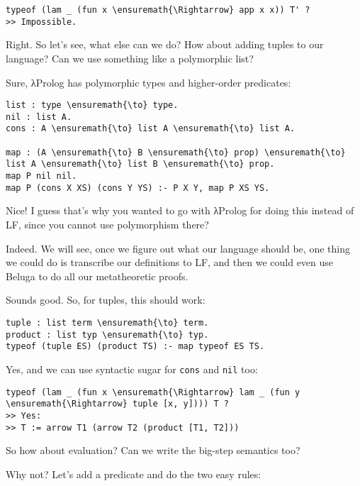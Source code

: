 \begin{verbatim}
typeof (lam _ (fun x \ensuremath{\Rightarrow} app x x)) T' ?
>> Impossible.
\end{verbatim}

\heroSTUDENT{} Right. So let's see, what else can we do? How about adding
tuples to our language? Can we use something like a polymorphic list?

\heroADVISOR{} Sure, \foreignlanguage{greek}{λ}Prolog has polymorphic types and higher-order
predicates:

\begin{verbatim}
list : type \ensuremath{\to} type.
nil : list A.
cons : A \ensuremath{\to} list A \ensuremath{\to} list A.

map : (A \ensuremath{\to} B \ensuremath{\to} prop) \ensuremath{\to} list A \ensuremath{\to} list B \ensuremath{\to} prop.
map P nil nil.
map P (cons X XS) (cons Y YS) :- P X Y, map P XS YS.
\end{verbatim}

\heroSTUDENT{} Nice! I guess that's why you wanted to go with \foreignlanguage{greek}{λ}Prolog for
doing this instead of LF, since you cannot use polymorphism there?

\heroADVISOR{} Indeed. We will see, once we figure out what our language
should be, one thing we could do is transcribe our definitions to LF,
and then we could even use Beluga \citep{pientka2010beluga} to do all
our metatheoretic proofs.

\heroSTUDENT{} Sounds good. So, for tuples, this should work:

\begin{verbatim}
tuple : list term \ensuremath{\to} term.
product : list typ \ensuremath{\to} typ.
typeof (tuple ES) (product TS) :- map typeof ES TS.
\end{verbatim}

\heroADVISOR{} Yes, and we can use syntactic sugar for \texttt{cons} and
\texttt{nil} too:

\begin{verbatim}
typeof (lam _ (fun x \ensuremath{\Rightarrow} lam _ (fun y \ensuremath{\Rightarrow} tuple [x, y]))) T ?
>> Yes:
>> T := arrow T1 (arrow T2 (product [T1, T2]))
\end{verbatim}

\heroSTUDENT{} So how about evaluation? Can we write the big-step semantics
too?

\heroADVISOR{} Why not? Let's add a predicate and do the two easy rules:


